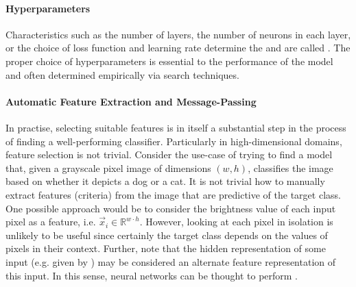 \documentclass[
	fontsize=10pt, %
	twoside=false, %
	secnumdepth=1, %
  toc=indentunnumbered %
]{kaobook}
\begin{document}
\paragraph{Hyperparameters} Characteristics such as the number of layers, the
number of neurons in each layer, or the choice of loss function and learning rate
determine the  and are called
. The proper choice of hyperparameters is essential to the
performance of the model and often determined empirically via search techniques.

\paragraph{Automatic Feature Extraction and Message-Passing}
In practise, selecting suitable features is in itself a substantial
step in the process of finding a well-performing classifier.
%
Particularly in high-dimensional domains, feature selection is not trivial.
Consider the use-case of trying to find a model that, given a grayscale pixel
image of dimensions $(w, h)$, classifies the image based on whether it depicts a
dog or a cat. It is not trivial how to manually extract features (criteria) from
the image that are predictive of the target class. One possible approach
would be to consider the brightness value of each input pixel as a feature, i.e.
$\vec x_i \in \mathbb{R}^{w \cdot h}$. However, looking at each
pixel in isolation is unlikely to be useful since certainly the target class
depends on the values of pixels in their context.
Further, note that the hidden representation of some input (e.g. given by
) may be considered an alternate feature representation
of this input. In this sense, neural networks can be thought to perform
. 
\end{document}

